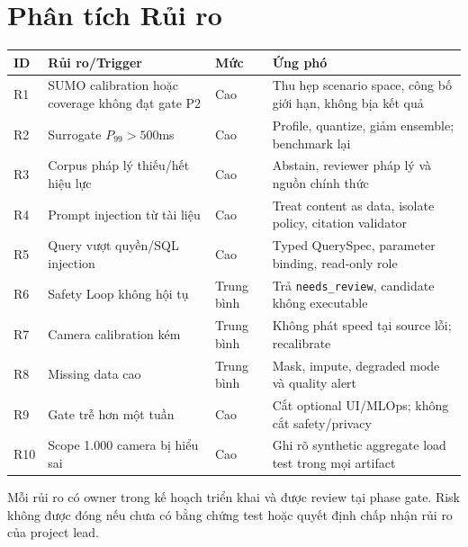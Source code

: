 \chapter{Phân tích Rủi ro}

\begin{longtable}{p{1cm} p{5cm} p{2cm} p{5.5cm}}
\toprule
\textbf{ID} & \textbf{Rủi ro/Trigger} & \textbf{Mức} & \textbf{Ứng phó} \\
\midrule
R1 & SUMO calibration hoặc coverage không đạt gate P2 & Cao & Thu hẹp scenario space, công bố giới hạn, không bịa kết quả \\
R2 & Surrogate $P_{99}>500$ms & Cao & Profile, quantize, giảm ensemble; benchmark lại \\
R3 & Corpus pháp lý thiếu/hết hiệu lực & Cao & Abstain, reviewer pháp lý và nguồn chính thức \\
R4 & Prompt injection từ tài liệu & Cao & Treat content as data, isolate policy, citation validator \\
R5 & Query vượt quyền/SQL injection & Cao & Typed QuerySpec, parameter binding, read-only role \\
R6 & Safety Loop không hội tụ & Trung bình & Trả \texttt{needs\_review}, candidate không executable \\
R7 & Camera calibration kém & Trung bình & Không phát speed tại source lỗi; recalibrate \\
R8 & Missing data cao & Trung bình & Mask, impute, degraded mode và quality alert \\
R9 & Gate trễ hơn một tuần & Cao & Cắt optional UI/MLOps; không cắt safety/privacy \\
R10 & Scope 1.000 camera bị hiểu sai & Cao & Ghi rõ synthetic aggregate load test trong mọi artifact \\
\bottomrule
\end{longtable}

Mỗi rủi ro có owner trong kế hoạch triển khai và được review tại phase gate. Risk không được đóng nếu chưa có bằng chứng test hoặc quyết định chấp nhận rủi ro của project lead.
